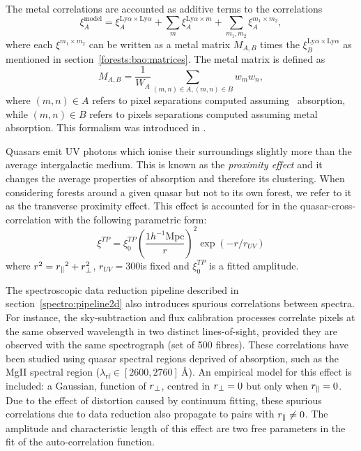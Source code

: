 The metal correlations are accounted as additive terms to the \lya 
correlations
\begin{equation}
\xi^\mathrm{model}_A =    \xi^{\mathrm{Ly}\alpha \times \mathrm{Ly}\alpha  }_A 
    + \sum_m \xi^{\mathrm{Ly}\alpha  \times m}_A
    + \sum_{m_1, m_2} \xi^{m_1 \times m_2}_A,
\end{equation}
where each $\xi^{m_1 \times m_2}$ can be written as a metal matrix 
$M_{A,B}$ times the $\xi^{\mathrm{Ly}\alpha \times \mathrm{Ly}\alpha  }_B$ 
as mentioned in section~\ref{forests:bao:matrices}. The metal matrix is 
defined as 
\begin{equation}
M_{A,B} = \frac{1}{W_A}  \sum_{(m,n)\in A, (m, n)\in B} w_m w_n, 
\end{equation}
where $(m, n)\in A$ refers to pixel separations computed assuming 
\lya\ absorption, while $(m, n)\in B$ refers to pixels separations  
computed assuming metal absorption. This formalism was introduced 
in \cite{blomqvistTriplyionizedCarbonForest2018}. 

Quasars emit UV photons which ionise their surroundings slightly 
more than the average intergalactic medium. This is known as the 
\emph{proximity effect} and it changes the average properties of 
\lya absorption and therefore its clustering. When considering 
forests around a given quasar but not to its own forest, we refer 
to it as the transverse proximity effect. This effect is accounted  
for in the quasar-\lya cross-correlation with the following parametric
form:
\begin{equation}
\xi^{TP} = \xi_0^{TP} \left( \frac{1 h^{-1} \mathrm{Mpc}}{r} \right)^2 \exp \left( - r /r_{UV} \right)
\end{equation}
where $r^2 = {r_\parallel}^2 + r^2_\perp$, $r_{UV} = 300$\hmpc is fixed and $\xi_0^{TP}$ 
is a fitted amplitude. 

The spectroscopic data reduction pipeline described in section~\ref{spectro:pipeline2d}
also introduces spurious correlations between spectra. 
For instance, the sky-subtraction and flux calibration processes 
correlate pixels at the same observed wavelength in two distinct lines-of-sight, 
provided they are observed with the same spectrograph (set of 500 fibres). 
These correlations have been studied using quasar spectral regions deprived of \lya absorption,
such as the MgII spectral region ($\lambda_\mathrm{rf} \in {[2600, 2760]}~\unit{\angstrom}$).
An empirical model for this effect is included: 
a Gaussian, function of ${r_\perp}$, centred in ${r_\perp} = 0$ but only when ${r_\parallel} = 0$. 
Due to the effect of distortion caused by continuum fitting, these spurious
correlations due to data reduction also propagate to pairs with ${r_\parallel} \neq 0$.  
The amplitude and characteristic length of this effect are two free parameters
in the fit of the \lya auto-correlation function.

